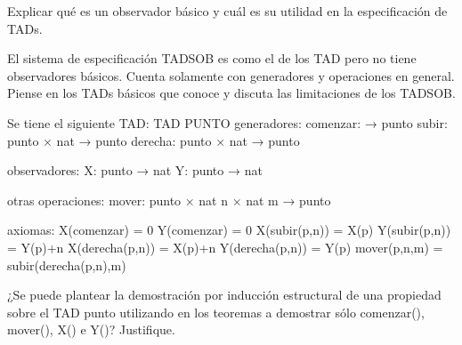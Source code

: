 \documentclass[10pt,a4paper,notitlepage]{article}
\begin{document}
Explicar qué es un observador básico y cuál es su utilidad en la especificación de TADs.

El sistema de especificación TADSOB es como el de los TAD pero no tiene observadores básicos. Cuenta solamente con generadores y operaciones en general. Piense en los TADs básicos que conoce y discuta las limitaciones de los TADSOB.

Se tiene el siguiente TAD:
TAD PUNTO
generadores:
comenzar: → punto
subir: punto × nat → punto
derecha: punto × nat → punto

observadores:
X: punto → nat
Y: punto → nat

otras operaciones:
mover: punto × nat n × nat m → punto

axiomas:
X(comenzar) = 0
Y(comenzar) = 0
X(subir(p,n)) = X(p)
Y(subir(p,n)) = Y(p)+n
X(derecha(p,n)) = X(p)+n
Y(derecha(p,n)) = Y(p)
mover(p,n,m) = subir(derecha(p,n),m)

¿Se puede plantear la demostración por inducción estructural de una propiedad sobre el TAD punto utilizando en los teoremas a demostrar sólo comenzar(), mover(), X() e Y()? Justifique.
\end{document}
